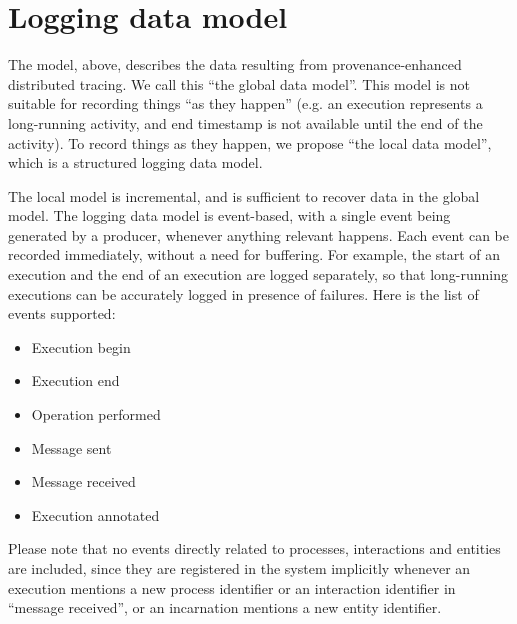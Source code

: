 
\section{Logging data model}\label{sec:logging-model}

The model, above, describes the data resulting from provenance-enhanced distributed tracing. We call this ``the global data model''. This model is not suitable for recording things ``as they happen'' (e.g. an execution represents a long-running activity, and end timestamp is not available until the end of the activity). To record things as they happen, we propose ``the local data model'', which is a structured logging data model.

The local model is incremental, and is sufficient to recover data in the global model. The logging data model is event-based, with a single event being generated by a producer, whenever anything relevant happens. Each event can be recorded immediately, without a need for buffering. For example, the start of an execution and the end of an execution are logged separately, so that long-running executions can be accurately logged in presence of failures. Here is the list of events supported:
%
\begin{itemize}[nosep]
	\item Execution begin
	\item Execution end
	\item Operation performed
	\item Message sent
	\item Message received
	\item Execution annotated
\end{itemize}

Please note that no events directly related to processes, interactions and entities are included, since they are registered in the system implicitly whenever an execution mentions a new process identifier or an interaction identifier in ``message received'', or an incarnation mentions a new entity identifier.


